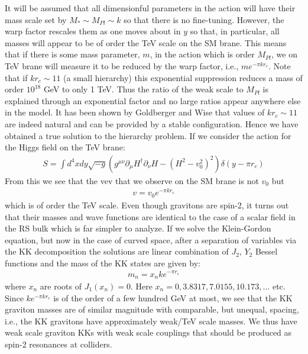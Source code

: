 It will be assumed that all dimensionful parameters in the action will have their mass scale set by $M_{*} \sim M_{Pl} \sim k$ so that there is no fine-tuning. However, the warp factor rescales them as one moves about in $y$ so that, in particular, all masses will appear to be of order the
TeV scale on the SM brane. This means that if there is some mass parameter, $m$, in the action which is order $M_{Pl}$, we on TeV brane will measure it to be reduced by the warp factor, i.e., $me^{-\pi k r_{c}}$. Note that if $kr_{c} \sim 11$ (a
small hierarchy) this exponential suppression reduces a mass of order $10^{18}$ GeV to only 1 TeV. Thus the ratio of the weak scale to $M_{Pl}$ is explained through an exponential factor and no large ratios appear anywhere else in the model. It has been shown by Goldberger and Wise \cite{Goldb} that values of $kr_{c} \sim 11$ are indeed natural and can be provided by a stable configuration. Hence we have obtained a true solution to the hierarchy problem.
If we consider the action for the Higgs field on the TeV brane:
\begin{eqnarray}
S = \int d^{4}x dy \sqrt{-g} \left(g^{\mu\nu}\partial_{\mu}H^{\dag}\partial_{\nu}H-\left(H^{2}-v_{0}^{2} \right)^{2}\right)\delta\left(y-\pi r_{c} \right)     
\end{eqnarray}
From this we see that the vev that we observe on the SM brane is not $v_{0}$ but
\begin{eqnarray}
v = v_{0} e^{ -\pi k r_{c}}
\end{eqnarray}
which is of order the TeV scale.
Even though gravitons are spin-2, it turns out that their masses
and wave functions are identical to the case of a scalar field in the RS bulk which is far simpler to analyze. If we solve the Klein-Gordon equation, but now in the case of curved space, after a separation of variables via the KK decomposition the solutions are linear combination of $J_{2}$, $Y_{2}$ Bessel functions and the mass of the KK states are given by: 
\begin{eqnarray}
m_{n} = x_{n} k e ^{-\pi r_{c}}
\end{eqnarray}
where $x_{n}$ are roots of $J_{1}(x_{n})=0$. Here $x_{n} = 0, 3.8317, 7.0155, 10.173, \dots$ etc. Since $k e^{-\pi k r_{c}}$ is of the order of a few hundred GeV at most, we see that the KK graviton masses are of similar magnitude with comparable, but unequal, spacing, i.e., the KK gravitons have approximately weak/TeV scale masses. We thus have weak scale graviton KKs with weak scale couplings that should be produced as spin-2 resonances at colliders.

